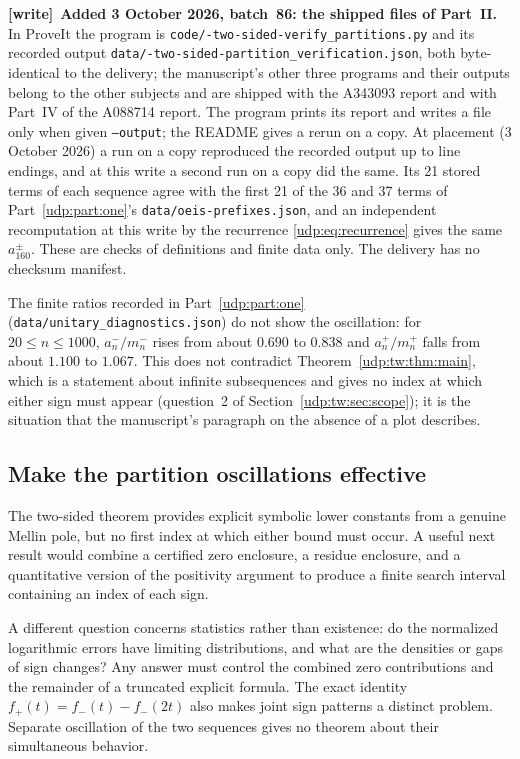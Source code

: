 \documentclass[11pt]{article}
\theoremstyle{remark}\newtheorem{remark}[theorem]{Remark}
\newenvironment{writenote}[1][]{\par\smallskip\begingroup\small
 \noindent\textbf{[write]}\if\relax\detokenize{#1}\relax\else~\textbf{#1.}\fi\ }%
 {\par\endgroup\smallskip}
\numberwithin{equation}{section}
\begin{document}
\begin{writenote}[Added 3 October 2026, batch~86: the shipped files of Part~II]
In ProveIt the program is
\texttt{code/-two-sided-\allowbreak verify\_\allowbreak partitions.py}
and its recorded output
\texttt{data/-two-sided-\allowbreak partition\_\allowbreak verification.json},
both byte-identical to the delivery; the manuscript's other three programs
and their outputs belong to the other subjects and are shipped with the
A343093 report and with Part~IV of the A088714 report. The program prints
its report and writes a file only when given \texttt{--output}; the README
gives a rerun on a copy. At placement (3 October 2026) a run on a copy
reproduced the recorded output up to line endings, and at this write a
second run on a copy did the same. Its 21 stored terms of each sequence
agree with the first 21 of the 36 and 37 terms of
Part~\ref{udp:part:one}'s \texttt{data/\allowbreak oeis-prefixes.json}, and
an independent recomputation at this write by the recurrence
\eqref{udp:eq:recurrence} gives the same $a_{160}^\pm$. These are checks of
definitions and finite data only. The delivery has no checksum manifest.

The finite ratios recorded in Part~\ref{udp:part:one}
(\texttt{data/\allowbreak unitary\_\allowbreak diagnostics.json}) do not
show the oscillation: for $20\le n\le1000$, $a_n^-/m_n^-$ rises from about
$0.690$ to $0.838$ and $a_n^+/m_n^+$ falls from about $1.100$ to $1.067$.
This does not contradict Theorem~\ref{udp:tw:thm:main}, which is a statement
about infinite subsequences and gives no index at which either sign must
appear (question~2 of Section~\ref{udp:tw:sec:scope}); it is the situation
that the manuscript's paragraph on the absence of a plot describes.
\end{writenote}

\subsection{Make the partition oscillations effective}

The two-sided theorem provides explicit symbolic lower constants
from a genuine Mellin pole, but no first index at which either bound
must occur. A useful next result would combine a certified zero
enclosure, a residue enclosure, and a quantitative version of the
positivity argument to produce a finite search interval containing
an index of each sign.

A different question concerns statistics rather than existence:
do the normalized logarithmic errors have limiting distributions,
and what are the densities or gaps of sign changes? Any answer must
control the combined zero contributions and the remainder of a
truncated explicit formula. The exact identity
$f_+(t)=f_-(t)-f_-(2t)$ also makes joint sign patterns a distinct
problem. Separate oscillation of the two sequences gives no theorem
about their simultaneous behavior.
\end{document}
